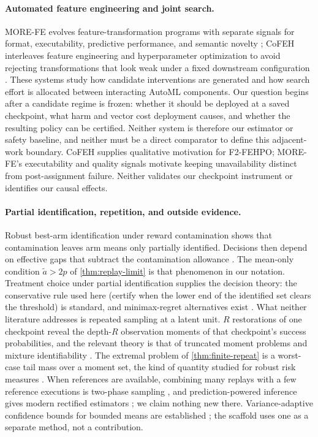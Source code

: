 \paragraph{Automated feature engineering and joint search.}
MORE-FE evolves feature-transformation programs with separate signals for
format, executability, predictive performance, and semantic novelty
\citep{morefe2026}; CoFEH interleaves feature engineering and hyperparameter
optimization to avoid rejecting transformations that look weak under a fixed
downstream configuration \citep{cofeh2026}.  These systems study how candidate
interventions are generated and how search effort is allocated between
interacting AutoML components.  Our question begins after a candidate regime is
frozen: whether it should be deployed at a saved checkpoint, what harm and
vector cost deployment causes, and whether the resulting policy can be
certified.  Neither system is therefore our estimator or safety baseline, and
neither must be a direct comparator to define this adjacent-work boundary.
CoFEH supplies qualitative motivation for F2-FEHPO; MORE-FE's executability and
quality signals motivate keeping unavailability distinct from post-assignment
failure.  Neither validates our checkpoint instrument or identifies our causal
effects.

\paragraph{Partial identification, repetition, and outside evidence.}
Robust best-arm identification under reward contamination shows that
contamination leaves arm means only partially identified.  Decisions then
depend on effective gaps that subtract the contamination allowance
\citep{altschuler2019,mukherjee2021}.  The mean-only condition $\tilde a>2p$ of
\cref{thm:replay-limit} is that phenomenon in our notation.  Treatment choice
under partial identification supplies the decision theory: the conservative
rule used here (certify when the lower end of the identified set clears the
threshold) is standard, and minimax-regret alternatives exist
\citep{manski2000,stoye2012,montielolea2023}.  What neither literature
addresses is repeated sampling at a latent unit.  $R$ restorations of one
checkpoint reveal the depth-$R$ observation moments of that checkpoint's success
probabilities, and the relevant theory is that of truncated moment problems
and mixture identifiability \citep{karlinstudden1966,kemperman1968,schmudgen2017,teicher1963}.
The extremal problem of \cref{thm:finite-repeat} is a worst-case tail mass
over a moment set, the kind of quantity studied for robust risk measures
\citep{rockafellar2000,zhu2009,bertsimas2005}.  When references are available,
combining many replays with a few reference executions is two-phase sampling
\citep{neyman1938,cochran1977}, and prediction-powered inference gives modern
rectified estimators \citep{angelopoulos2023ppi}; we claim nothing new there.
Variance-adaptive confidence bounds for bounded means are established
\citep{maurer2009,waudbysmith2024}; the scaffold uses one as a separate method,
not a contribution.

